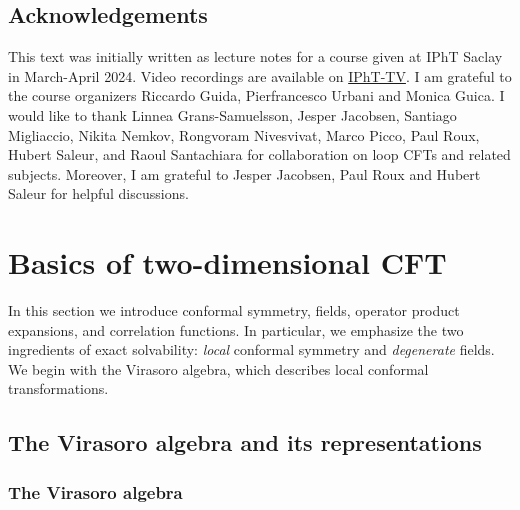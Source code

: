 \documentclass[12pt, a4paper]{article}
\theoremstyle{break}
\begin{document}
\subsection*{Acknowledgements}

This text was initially written as lecture notes for a course given at IPhT Saclay in March-April 2024. Video recordings are available on \href{https://www.youtube.com/playlist?list=PLrLctLPAdPNtD7yFOcfdNx2J-A_CE1svr}{IPhT-TV}. I am grateful to the course organizers Riccardo Guida, Pierfrancesco Urbani and Monica Guica. I would like to thank Linnea Grans-Samuelsson, Jesper Jacobsen, Santiago Migliaccio, Nikita Nemkov, Rongvoram Nivesvivat, Marco Picco, Paul Roux, Hubert Saleur, and Raoul Santachiara for collaboration on loop CFTs and related subjects. Moreover, I am grateful to Jesper Jacobsen, Paul Roux and Hubert Saleur for helpful discussions. 



\section{Basics of two-dimensional CFT}\label{sec:bo}

In this section we introduce conformal symmetry, fields, operator product expansions, and correlation functions. In particular, we emphasize the two ingredients of exact solvability: \textit{local} conformal symmetry and \textit{degenerate} fields. We begin with the Virasoro algebra, which describes local conformal transformations. 

\subsection{The Virasoro algebra and its representations}\label{sec:vir}

\subsubsection{The Virasoro algebra}
\end{document}
